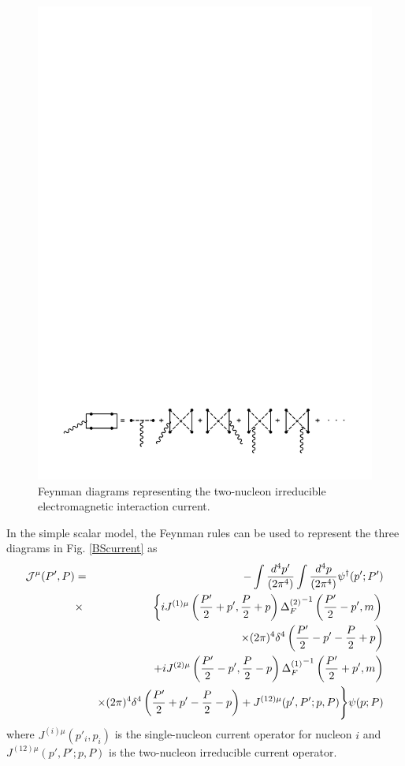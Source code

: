 \documentclass[mythesis.tex]{subfiles}
\begin{document}
\begin{figure}
\centerline{\includegraphics[width=5in]{graphics/new/exchange.pdf}}
\caption{Feynman diagrams representing the two-nucleon irreducible
electromagnetic interaction current.}\label{BSexchange}
\end{figure}

In the simple scalar model, the Feynman rules can be used to represent
the three diagrams in Fig. \ref{BScurrent} as
%
\begin{eqnarray}
{\cal J}^\mu(P',P)&=&-\int\frac{d^4p'}{(2\pi^4)}\int\frac{d^4p}{(2\pi^4)}
\psi^\dagger(p';P') \nonumber \\
&\times&\left\{ i J^{(1)\mu}\left(\frac{P'}{2}+p',\frac{P}{2}+p\right)
{\Delta^{(2)}_F}^{-1}\left(\frac{P'}{2}-p',m\right) \right.  \nonumber \\
& &\times (2\pi)^4
\delta^4\left(\frac{P'}{2}-p'-\frac{P}{2}+p\right) \nonumber \\
& &+i J^{(2)\mu}\left(\frac{P'}{2}-p',\frac{P}{2}-p\right)
{\Delta^{(1)}_F}^{-1}\left(\frac{P'}{2}+p',m\right) \nonumber \\
& &\times (2\pi)^4
\delta^4\left(\frac{P'}{2}+p'-\frac{P}{2}-p\right)
 +J^{(12)\mu}(p',P';p,P)\Biggr\} \psi(p;P)\label{BScurME}
\end{eqnarray}
%
where $J^{(i)\mu}(p'_i,p_i)$ is the single-nucleon current operator for
nucleon $i$ and $J^{(12)\mu}(p',P';p,P)$ is the two-nucleon irreducible
current operator.
\end{document}
